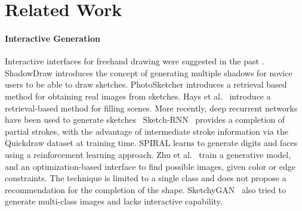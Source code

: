 
\section{Related Work}

\paragraph{Interactive Generation} Interactive interfaces for freehand drawing were suggested in the past \cite{baudel1994mark}. ShadowDraw \cite{lee2011shadowdraw} introduces the concept of generating multiple shadows for novice users to be able to draw sketches. PhotoSketcher \cite{eitz2011photosketcher} introduces a retrieval based method for obtaining real images from sketches. Hays et al.~\cite{hays2007scene} introduce a retrieval-based method for filling scenes.
More recently, deep recurrent networks have been used to generate sketches~\cite{ha2017neural,ganin2018synthesizing} Sketch-RNN~\cite{ha2017neural} provides a completion of partial strokes, with the advantage of intermediate stroke information via the Quickdraw dataset at training time. SPIRAL \cite{ganin2018synthesizing} learns to generate digits and faces using a reinforcement learning approach.
Zhu et al.~\cite{zhu2016generative} train a generative model, and an optimization-based interface to find possible images, given color or edge constraints. The technique is limited to a single class and does not propose a recommendation for the completion of the shape. SketchyGAN~\cite{chen2018sketchygan} also tried to generate multi-class images and lacks interactive capability.

